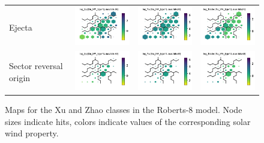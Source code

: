 \documentclass[utf8]{frontiersSCNS} %
\begin{document}
\begin{figure}[h!]
\begin{tabular}{m{2.5cm}CCC}
		Ejecta & \includegraphics[width=4cm]{Roberts/SWtype-Xu_SW_type-2-log_Sp} &
		\includegraphics[width=4cm]{Roberts/SWtype-Xu_SW_type-2-log_Va} &
		\includegraphics[width=4cm]{Roberts/SWtype-Xu_SW_type-2-log_Tratio} \hfill	\\
		
		Sector reversal origin & \includegraphics[width=4cm]{Roberts/SWtype-Xu_SW_type-3-log_Sp} &
		\includegraphics[width=4cm]{Roberts/SWtype-Xu_SW_type-3-log_Va} &
		\includegraphics[width=4cm]{Roberts/SWtype-Xu_SW_type-3-log_Tratio} \hfill	\\
	\end{tabular}
	\caption{Maps for the Xu and Zhao classes in the Roberts-8 model. Node sizes indicate hits, colors indicate values of the corresponding solar wind property.}\label{fig:SWtXuRoberts}
\end{figure}
\end{document}
